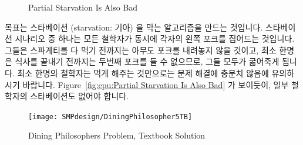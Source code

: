 \begin{figure}[tb]
\begin{center}
\end{center}
\caption{Partial Starvation Is Also Bad}
\end{figure}

목표는 스타베이션 (starvation: 기아) 을 막는 알고리즘을 만드는 것입니다.
스타베이션 시나리오 중 하나는 모든 철학자가 동시에 각자의 왼쪽 포크를 집어드는
것입니다.
그들은 스파게티를 다 먹기 전까지는 아무도 포크를 내려놓지 않을 것이고, 최소
한명은 식사를 끝내기 전까지는 두번째 포크를 들 수 없으므로, 그들 모두가
굶어죽게 됩니다.
최소 한명의 철학자는 먹게 해주는 것만으로는 문제 해결에 충분치 않음에
유의하시기 바랍니다.
Figure~\ref{fig:cpu:Partial Starvation Is Also Bad} 가 보이듯이, 일부 철학자의
스타베이션도 없어야 합니다.

\begin{figure}[tb]
\begin{center}
\texttt{[image: SMPdesign/DiningPhilosopher5TB]}
\end{center}
\caption{Dining Philosophers Problem, Textbook Solution}
\end{figure}

